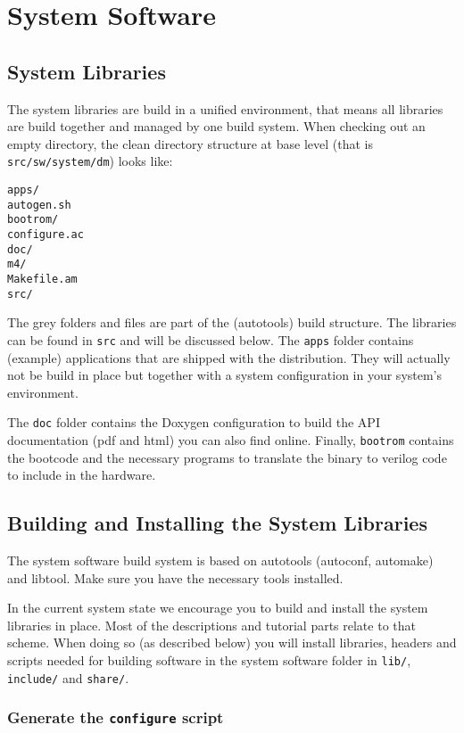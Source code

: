 \chapter{System Software}
\label{chap:systemsoftware}

\section{System Libraries}

The system libraries are build in a unified environment, that means
all libraries are build together and managed by one build system. When
checking out an empty directory, the clean directory structure at base
level (that is \verb|src/sw/system/dm|) looks like:

\begin{lstlisting}
apps/
autogen.sh
bootrom/
configure.ac
doc/
m4/
Makefile.am
src/
\end{lstlisting}

The grey folders and files are part of the (autotools) build
structure. The libraries can be found in \verb|src| and will be
discussed below. The \verb|apps| folder contains (example)
applications that are shipped with the distribution. They will
actually not be build in place but together with a system
configuration in your system's environment.

The \verb|doc| folder contains the Doxygen configuration to build the
API documentation (pdf and html) you can also find online. Finally,
\verb|bootrom| contains the bootcode and the necessary programs to
translate the binary to verilog code to include in the hardware.

\section{Building and Installing the System Libraries}

The system software build system is based on autotools (autoconf,
automake) and libtool. Make sure you have the necessary tools
installed.

In the current system state we encourage you to build and install the
system libraries in place. Most of the descriptions and tutorial parts
relate to that scheme. When doing so (as described below) you will
install libraries, headers and scripts needed for building software in
the system software folder in \verb|lib/|, \verb|include/| and
\verb|share/|.

\subsection{Generate the \texttt{configure} script}

